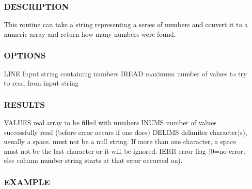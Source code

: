 \subsubsection*{D\+E\+S\+C\+R\+I\+P\+T\+I\+ON}

This routine can take a string representing a series of numbers and convert it to a numeric array and return how many numbers were found.

\subsubsection*{O\+P\+T\+I\+O\+NS}

\begin{DoxyVerb}   LINE     Input string containing numbers
   IREAD    maximum number of values to try to read from input string
\end{DoxyVerb}


\subsubsection*{R\+E\+S\+U\+L\+TS}

\begin{DoxyVerb}   VALUES   real array to be filled with numbers
   INUMS    number of values successfully read (before error occurs
            if one does)
   DELIMS   delimiter character(s), usually a space. must not be a
            null string. If more than one character, a space must
            not be the last character or it will be ignored.
   IERR     error flag (0=no error, else column number string starts
            at that error occurred on).
\end{DoxyVerb}


\subsubsection*{E\+X\+A\+M\+P\+LE}

